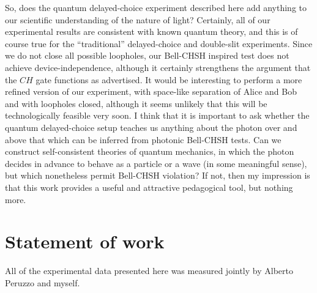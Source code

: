 So, does the quantum delayed-choice experiment described here add anything to our scientific understanding of the nature of light? Certainly, all of our experimental results are consistent with known quantum theory, and this is of course true for the ``traditional'' delayed-choice and double-slit experiments. Since we do not close all possible loopholes, our Bell-CHSH inspired test does not achieve device-independence, although it certainly strengthens the argument that the $CH$ gate functions as advertised. It would be interesting to perform a more refined version of our experiment, with space-like separation of Alice and Bob and with loopholes closed, although it seems unlikely that this will be technologically feasible very soon.  I think that it is important to ask whether the quantum delayed-choice setup teaches us anything about the  photon over and above that which can be inferred from photonic Bell-CHSH tests. Can we construct self-consistent theories of quantum mechanics, in which the photon decides in advance to behave as a particle or a wave (in some meaningful sense), but which nonetheless permit Bell-CHSH violation? If not, then my impression is that this work provides a useful and attractive pedagogical tool, but nothing more.

\section*{Statement of work}
All of the experimental data presented here was measured jointly by Alberto Peruzzo and myself. 



